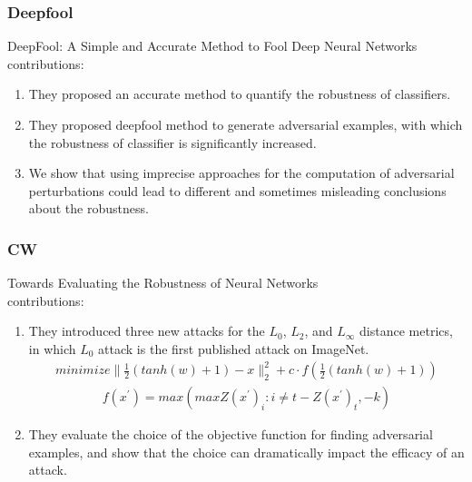 \documentclass[10pt]{beamer}
\begin{document}
\subsubsection{Deepfool}
\begin{frame}
  DeepFool: A Simple and Accurate Method to Fool Deep Neural Networks~\cite{deepfool}\\
  contributions:
  \begin{enumerate}
    \item They proposed an accurate method to quantify the robustness of classifiers.
    \item They proposed deepfool method to generate adversarial examples, with which the 
    robustness of classifier is significantly increased.
    \item We show that using imprecise approaches for the computation of adversarial 
    perturbations could lead to different and sometimes misleading conclusions about 
    the robustness.
  \end{enumerate}
\end{frame}

\subsubsection{CW}
\begin{frame}
  Towards Evaluating the Robustness of Neural Networks~\cite{cw}\\
  contributions:
  \begin{enumerate}
    \item They introduced three new attacks for the $L_0$, $L_2$, and $L_{\infty}$
    distance metrics, in which $L_0$ attack is the first published attack on ImageNet.
    \begin{align}
      minimize \| \frac{1}{2}(tanh(w)+1) - x \|_{2}^{2} + c\cdot f(\frac{1}{2}(tanh(w)+1)) 
    \end{align}
    \begin{align}
      f(x^{'}) = max(max{Z(x^{'})_i:i \neq t} - Z(x^{'})_t, -k)
    \end{align}
    \item They evaluate the choice of the objective function for finding adversarial examples, and show that
    the choice can dramatically impact the efficacy of an attack.
  \end{enumerate}
\end{frame}
\end{document}
